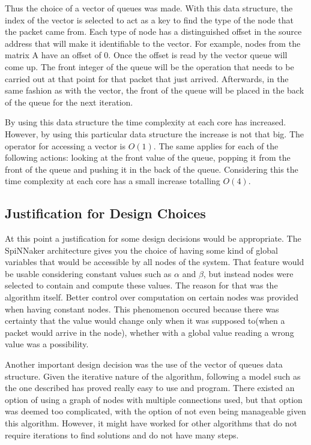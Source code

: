 \documentclass[12pt,a4paper]{article}
\begin{document}
Thus the choice of a vector of queues was made. With this data structure, the index of the vector is selected to act as a key to find the type of the node that the packet came from. Each type of node has a distinguished offset in the source address that will make it identifiable to the vector. For example, nodes from the matrix A have an offset of 0. Once the offset is read by the vector queue will come up. The front integer of the queue will be the operation that needs to be carried out at that point for that packet that just arrived. Afterwards, in the same fashion as with the vector, the front of the queue will be placed in the back of the queue for the next iteration.

By using this data structure the time complexity at each core has increased. However, by using this particular data structure the increase is not that big. The operator for accessing a vector is $O(1)$. The same applies for each of the following actions: looking at the front value of the queue, popping it from the front of the queue and pushing it in the back of the queue. Considering this the time complexity at each core has a small increase totalling $O(4)$.
\subsection{Justification for Design Choices}
At this point a justification for some design decisions would be appropriate. The SpiNNaker architecture gives you the choice of having some kind of global variables that would be accessible by all nodes of the system. That feature would be usable considering constant values such as $\alpha$ and $\beta$, but instead nodes were selected to contain and compute these values. The reason for that was the algorithm itself. Better control over computation on certain nodes was provided when having constant nodes. This phenomenon occured because there was certainty that the value would change only when it was supposed to(when a packet would arrive in the node), whether with a global value reading a wrong value was a possibility.

Another important design decision was the use of the vector of queues data structure. Given the iterative nature of the algorithm, following a model such as the one described has proved really easy to use and program. There existed an option of using a graph of nodes with multiple connections used, but that option was deemed too complicated, with the option of not even being manageable given this algorithm. However, it might have worked for other algorithms that do not require iterations to find solutions and do not have many steps.
\end{document}
